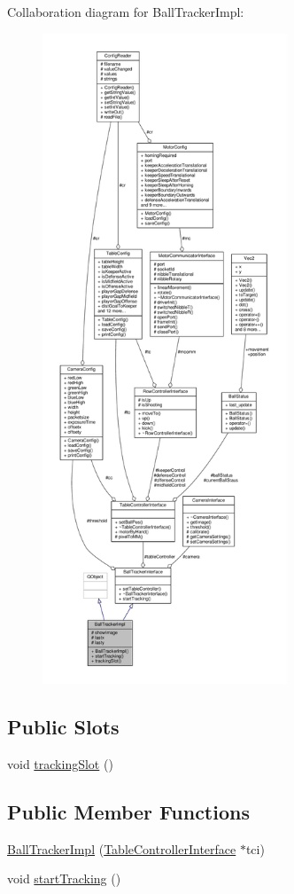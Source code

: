 Collaboration diagram for Ball\+Tracker\+Impl\+:\nopagebreak
\begin{figure}[H]
\begin{center}
\leavevmode
\includegraphics[height=550pt]{class_ball_tracker_impl__coll__graph}
\end{center}
\end{figure}
\subsection*{Public Slots}
\begin{DoxyCompactItemize}
\item 
void \hyperlink{class_ball_tracker_impl_a4a66db042c2b4a2f0c2f76c6c9fbfa96}{tracking\+Slot} ()
\end{DoxyCompactItemize}
\subsection*{Public Member Functions}
\begin{DoxyCompactItemize}
\item 
\hyperlink{class_ball_tracker_impl_a286916fd3631fd8dfffaa099f5ac1ace}{Ball\+Tracker\+Impl} (\hyperlink{class_table_controller_interface}{Table\+Controller\+Interface} $\ast$tci)
\item 
void \hyperlink{class_ball_tracker_impl_adafeb5b7297cc09a42fdcd00aa52b367}{start\+Tracking} ()
\end{DoxyCompactItemize}
